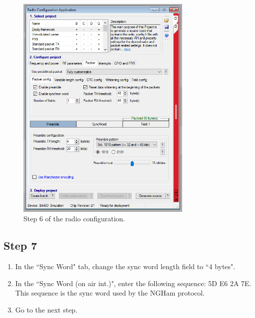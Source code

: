 \documentclass[12pt]{book}
\begin{document}
\begin{appendices}
\begin{figure}[!h]
	\begin{center}
		\includegraphics[width=0.75\textwidth]{figures/wds-tutorial-6.png}
		\caption{Step 6 of the radio configuration.}
		\label{fig:wds-tutorial-step-6}
	\end{center}
\end{figure}

\subsection{Step 7}

\begin{enumerate}
    \item In the ``Sync Word" tab, change the sync word length field to ``4 bytes".
    \item In the ``Sync Word (on air int.)", enter the following sequence: 5D E6 2A 7E. This sequence is the sync word used by the NGHam protocol.
    \item Go to the next step.
\end{enumerate}


\end{appendices}
\end{document}
